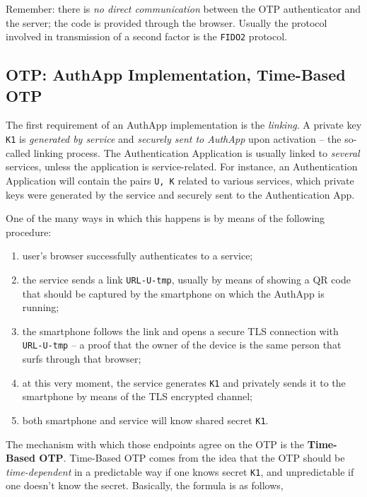 \documentclass[10pt]{extbook}
\begin{document}
Remember: there is \emph{no direct communication} between the OTP authenticator
and the server; the code is provided through the browser. Usually the protocol
involved in transmission of a second factor is the \texttt{FIDO2} protocol.

\subsection{OTP: AuthApp Implementation, Time\--Based OTP}

The first requirement of an AuthApp implementation is the \emph{linking}. A
private key \texttt{K1} is \emph{generated by service} and \emph{securely sent
to AuthApp} upon activation -- the so\--called linking process. The
Authentication Application is usually linked to \emph{several} services, unless
the application is service\--related. For instance, an Authentication
Application will contain the pairs \texttt{U, K} related to various services,
which private keys were generated by the service and securely sent to the
Authentication App.

One of the many ways in which this happens is by means of the following
procedure:
\begin{enumerate}
    \item user's browser successfully authenticates to a service;
    \item the service sends a link \texttt{URL-U-tmp}, usually by means of
        showing a QR code that should be captured by the smartphone on which
        the AuthApp is running;
    \item the smartphone follows the link and opens a secure TLS connection
        with \texttt{URL-U-tmp} -- a proof that the owner of the device is the
        same person that surfs through that browser;
    \item at this very moment, the service generates \texttt{K1} and privately
        sends it to the smartphone by means of the TLS encrypted channel;
    \item both smartphone and service will know shared secret \texttt{K1}.
\end{enumerate}

The mechanism with which those endpoints agree on the OTP is the
\textbf{Time\--Based OTP}. Time\--Based OTP comes from the idea that the OTP
should be \emph{time\--dependent} in a predictable way if one knows secret
\texttt{K1}, and unpredictable if one doesn't know the secret. Basically, the
formula is as follows,
\end{document}

